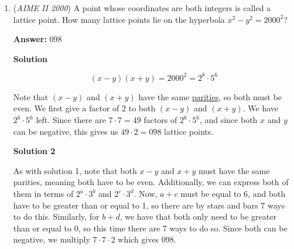 \begin{enumerate}
$\bold{Solution}$ $\bold{written}$ $\bold{by}$




\textbf{Solution 4}


 \[\frac{2}{\log_4 2000^6} + \frac{3}{\log_5 2000^6}\] 
 \[= \frac{1}{3\log_4 2000} + \frac{1}{2\log_5 2000}\] 
 \[= \frac{1}{3} \log_{2000} 4 + \frac{1}{2} \log_{2000} 5\] 
 \[= \log_{2000} (\sqrt[3]{4} \cdot \sqrt{5}) = x\] 
 \[\implies 2^{4x} \cdot 5^{3x} = 2^{\frac{2}{3}} \cdot 5^{\frac{1}{2}}\] 
 \[\implies 4x + (3\log_2 5)x = \frac{2}{3}+\frac{1}{2} \log_2 5\] 
 \[\implies x = \frac{\frac{2}{3} + \frac{1}{2} \log_2 5}{4 + 3\log_2 5}\] 
 \[\implies 6x = \frac{4 + 3\log_2 5}{4 + 3\log_2 5}\] 
 \[\implies x = \frac{1}{6}\] 
 \[\implies m + n = \boxed{007}\]



	\item (\textit{AIME II 2000}) A point whose coordinates are both integers is called a lattice point.  How many lattice points lie on the hyperbola $x^2 - y^2 = 2000^2$?


 
 \textbf{Answer: }098



\textbf{Solution}


 \[(x-y)(x+y)=2000^2=2^8 \cdot 5^6\]

 Note that $(x-y)$ and $(x+y)$ have the same \href{https://artofproblemsolving.com/wiki/index.php?title=Parity}{parities}, so both must be even. We first give a factor of $2$ to both $(x-y)$ and $(x+y)$. We have $2^6 \cdot 5^6$ left. Since there are $7 \cdot 7=49$ factors of $2^6 \cdot 5^6$, and since both $x$ and $y$ can be negative, this gives us $49\cdot2=\boxed{098}$ lattice points.

 



\textbf{Solution 2}

As with solution 1, note that both $x-y$ and $x+y$ must have the same parities, meaning both have to be even. Additionally, we can express both of them in terms of $2^a\cdot3^b$ and $2^c\cdot3^d$. Now, $a+c$ must be equal to 6, and both have to be greater than or equal to 1, so there are by stars and bars 7 ways to do this. Similarly, for $b+d$, we have that both only need to be greater than or equal to 0, so this time there are 7 ways to do so. Since both can be negative, we multiply $7\cdot7\cdot2$ which gives $098$.

 




\end{enumerate}
